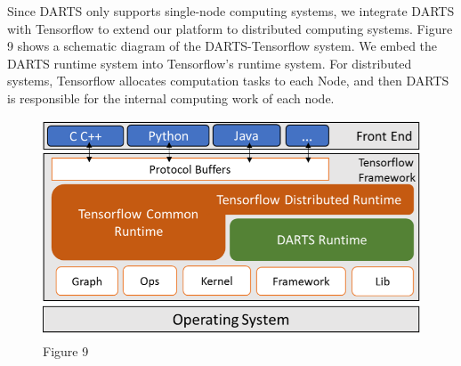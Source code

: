 Since DARTS only supports single-node computing systems, we integrate DARTS with Tensorflow to extend our platform to distributed computing systems. Figure 9 shows a schematic diagram of the DARTS-Tensorflow system. We embed the DARTS runtime system into Tensorflow's runtime system. For distributed systems, Tensorflow allocates computation tasks to each Node, and then DARTS is responsible for the internal computing work of each node.

\begin{figure}[h]
\caption{Figure 9}
\centering
\includegraphics[width=1\textwidth]{Fig/figure9.png}
\end{figure}